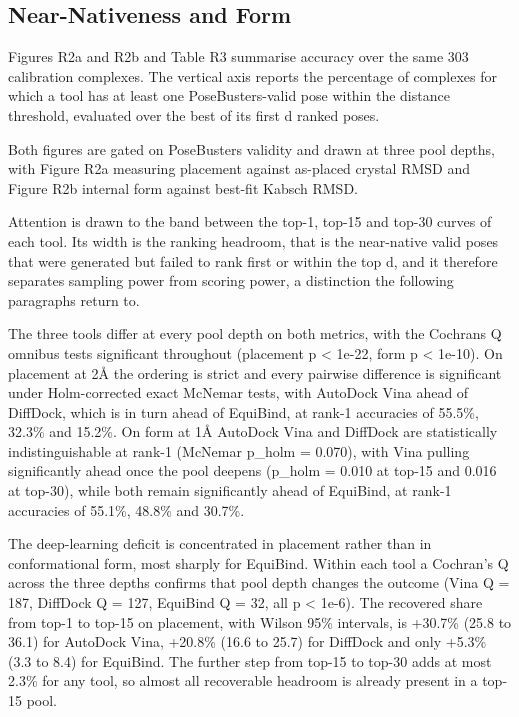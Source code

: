\hypertarget{near-nativeness-and-form}{%
\subsection{Near-Nativeness and Form}\label{near-nativeness-and-form}}

Figures R2a and R2b and Table R3 summarise accuracy over the same 303 calibration complexes. The vertical axis reports the percentage of complexes for which a tool has at least one PoseBusters-valid pose within the distance threshold, evaluated over the best of its first d ranked poses.

Both figures are gated on PoseBusters validity and drawn at three pool depths, with Figure R2a measuring placement against as-placed crystal RMSD and Figure R2b internal form against best-fit Kabsch RMSD.

Attention is drawn to the band between the top-1, top-15 and top-30 curves of each tool. Its width is the ranking headroom, that is the near-native valid poses that were generated but failed to rank first or within the top d, and it therefore separates sampling power from scoring power, a distinction the following paragraphs return to.

The three tools differ at every pool depth on both metrics, with the Cochran\textquotesingle s Q omnibus tests significant throughout (placement p \textless{} 1e-22, form p \textless{} 1e-10). On placement at 2Å the ordering is strict and every pairwise difference is significant under Holm-corrected exact McNemar tests, with AutoDock Vina ahead of DiffDock, which is in turn ahead of EquiBind, at rank-1 accuracies of 55.5\%, 32.3\% and 15.2\%. On form at 1Å AutoDock Vina and DiffDock are statistically indistinguishable at rank-1 (McNemar p\_holm = 0.070), with Vina pulling significantly ahead once the pool deepens (p\_holm = 0.010 at top-15 and 0.016 at top-30), while both remain significantly ahead of EquiBind, at rank-1 accuracies of 55.1\%, 48.8\% and 30.7\%.

The deep-learning deficit is concentrated in placement rather than in conformational form, most sharply for EquiBind. Within each tool a Cochran's Q across the three depths confirms that pool depth changes the outcome (Vina Q = 187, DiffDock Q = 127, EquiBind Q = 32, all p \textless{} 1e-6). The recovered share from top-1 to top-15 on placement, with Wilson 95\% intervals, is +30.7\% (25.8 to 36.1) for AutoDock Vina, +20.8\% (16.6 to 25.7) for DiffDock and only +5.3\% (3.3 to 8.4) for EquiBind. The further step from top-15 to top-30 adds at most 2.3\% for any tool, so almost all recoverable headroom is already present in a top-15 pool.

